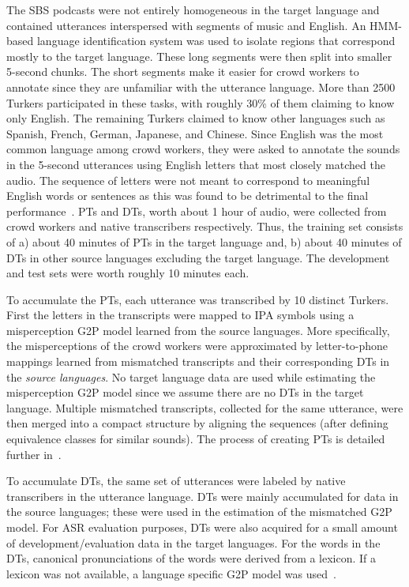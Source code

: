 \documentclass[a4paper]{article}
\begin{document}
The SBS podcasts were not entirely homogeneous in the target language and contained utterances interspersed with segments of music and English. An HMM-based language identification system was used to isolate regions that correspond mostly to the target language. These long segments were then split into smaller 5-second chunks. The short segments make it easier for crowd workers to annotate since they are unfamiliar with the utterance language. More than 2500 Turkers participated in these tasks, with roughly 30\% of them claiming to know only English. The remaining Turkers claimed to know other languages such as Spanish, French, German, Japanese, and Chinese. Since English was the most common language among crowd workers, they were asked to annotate the sounds in the 5-second utterances using English letters that most closely matched the audio. The sequence of letters were not meant to correspond to meaningful English words or sentences as this was found to be detrimental to the final performance~\cite{Jyothi2015}. PTs and DTs, worth about 1 hour of audio, were collected from crowd workers and native transcribers respectively. Thus, the training set consists of a) about 40 minutes of PTs in the target language and, b) about 40 minutes of DTs in other source languages  excluding the target language. The development and test sets were worth roughly 10 minutes each.

To accumulate the PTs, each utterance was transcribed by 10 distinct Turkers. First the letters in the transcripts were mapped to IPA symbols using a misperception G2P model learned from the source languages. More specifically, the misperceptions of the crowd workers were approximated by letter-to-phone mappings learned from mismatched transcripts and their corresponding DTs in the \emph{source languages}. No target language data are used while estimating the misperception G2P model since we assume there are no DTs in the target language. Multiple mismatched transcripts, collected for the same utterance, were then merged into a compact structure by aligning the sequences (after defining equivalence classes for similar sounds). The process of creating PTs is detailed further in~\cite{Jyothi-MismatchedCrowdsourcingTrans}.

To accumulate DTs, the same set of utterances were labeled by native transcribers in the utterance language.
DTs were mainly accumulated for data in the source languages; these  were used in the estimation of the mismatched G2P model. For ASR evaluation purposes, DTs were also acquired for a small amount of development/evaluation data in the target languages. For the words in the DTs, canonical pronunciations of the words were derived from a lexicon. If a lexicon was not available, a language specific G2P model was used~\cite{MarkG2P}.
\end{document}
